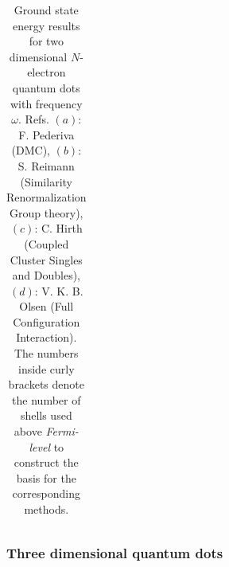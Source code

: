 \begin{table}
\begin{center}
\begin{tabular}{cc|rrrrrr}
\end{tabular}
\caption{Ground state energy results for two dimensional $N$-electron quantum dots with frequency $\omega$. Refs. $(a)$: F. Pederiva \cite{MagnusArticle} (DMC), $(b)$: S. Reimann \cite{Sarah} (Similarity Renormalization Group theory), $(c)$: C. Hirth \cite{Hirth} (Coupled Cluster Singles and Doubles), $(d)$: V. K. B. Olsen \cite{Olsen} (Full Configuration Interaction). The numbers inside curly brackets denote the number of shells used above \textit{Fermi-level} to construct the basis for the corresponding methods.}
\label{tab:QDotsResultsAll}
\end{center}
\end{table}
\setlength{\tabcolsep}{6pt}


\clearpage
\subsubsection{Three dimensional quantum dots}

